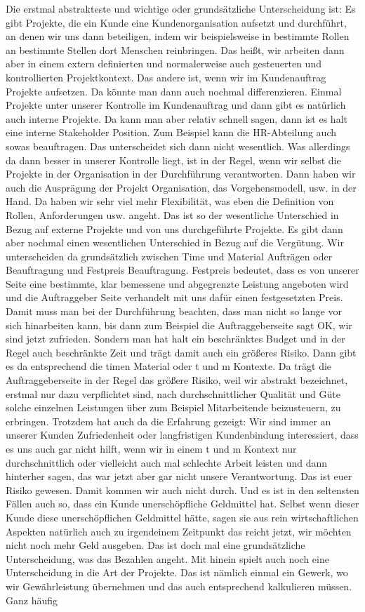 Die erstmal abstrakteste und wichtige oder grundsätzliche Unterscheidung ist: Es gibt Projekte, die ein Kunde eine Kundenorganisation aufsetzt und durchführt, an denen wir uns dann beteiligen, indem wir beispielsweise in bestimmte Rollen an bestimmte Stellen dort Menschen reinbringen. Das heißt, wir arbeiten dann aber in einem extern definierten und normalerweise auch gesteuerten und kontrollierten Projektkontext. Das andere ist, wenn wir im Kundenauftrag Projekte aufsetzen. Da könnte man dann auch nochmal differenzieren. Einmal Projekte unter unserer Kontrolle im Kundenauftrag und dann gibt es natürlich auch interne Projekte. Da kann man aber relativ schnell sagen, dann ist es halt eine interne Stakeholder Position. Zum Beispiel kann die HR-Abteilung auch sowas beauftragen. Das unterscheidet sich dann nicht wesentlich. Was allerdings da dann besser in unserer Kontrolle liegt, ist in der Regel, wenn wir selbst die Projekte in der Organisation in der Durchführung verantworten. Dann haben wir auch die Ausprägung der Projekt Organisation, das Vorgehensmodell, usw. in der Hand. Da haben wir sehr viel mehr Flexibilität, was eben die Definition von Rollen, Anforderungen usw. angeht. Das ist so der wesentliche Unterschied in Bezug auf externe Projekte und von uns durchgeführte Projekte. Es gibt dann aber nochmal einen wesentlichen Unterschied in Bezug auf die Vergütung. Wir unterscheiden da grundsätzlich zwischen Time und Material Aufträgen oder Beauftragung und Festpreis Beauftragung. Festpreis bedeutet, dass es von unserer Seite eine bestimmte, klar bemessene und abgegrenzte Leistung angeboten wird und die Auftraggeber Seite verhandelt mit uns dafür einen festgesetzten Preis. Damit muss man bei der Durchführung beachten, dass man nicht so lange vor sich hinarbeiten kann, bis dann zum Beispiel die Auftraggeberseite sagt OK, wir sind jetzt zufrieden. Sondern man hat halt ein beschränktes Budget und in der Regel auch beschränkte Zeit und trägt damit auch ein größeres Risiko. Dann gibt es da entsprechend die timen Material oder t und m Kontexte. Da trägt die Auftraggeberseite in der Regel das größere Risiko, weil wir abstrakt bezeichnet, erstmal nur dazu verpflichtet sind, nach durchschnittlicher Qualität und Güte solche einzelnen Leistungen über zum Beispiel Mitarbeitende beizusteuern, zu erbringen. Trotzdem hat auch da die Erfahrung gezeigt: Wir sind immer an unserer Kunden Zufriedenheit oder langfristigen Kundenbindung interessiert, dass es uns auch gar nicht hilft, wenn wir in einem t und m Kontext nur durchschnittlich oder vielleicht auch mal schlechte Arbeit leisten und dann hinterher sagen, das war jetzt aber gar nicht unsere Verantwortung. Das ist euer Risiko gewesen. Damit kommen wir auch nicht durch. Und es ist in den seltensten Fällen auch so, dass ein Kunde unerschöpfliche Geldmittel hat. Selbst wenn dieser Kunde diese unerschöpflichen Geldmittel hätte, sagen sie aus rein wirtschaftlichen Aspekten natürlich auch zu irgendeinem Zeitpunkt das reicht jetzt, wir möchten nicht noch mehr Geld ausgeben. Das ist doch mal eine grundsätzliche Unterscheidung, was das Bezahlen angeht. Mit hinein spielt auch noch eine Unterscheidung in die Art der Projekte. Das ist nämlich einmal ein Gewerk, wo wir Gewährleistung übernehmen und das auch entsprechend kalkulieren müssen. Ganz häufig 